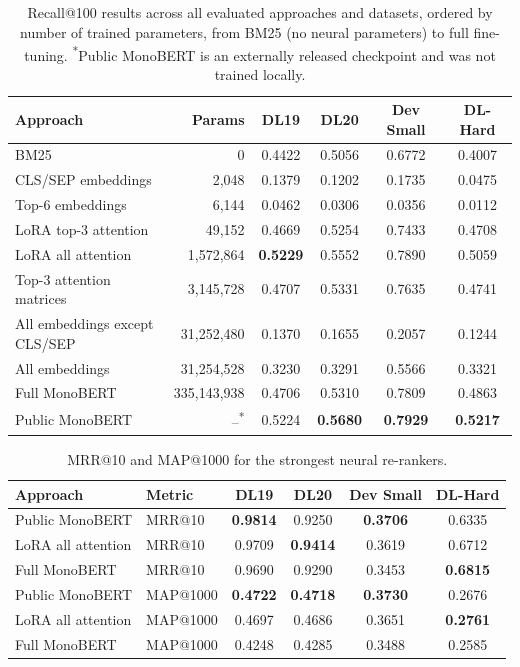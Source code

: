 \begin{table}[ht]
\centering
\small
\begin{tabular}{lrcccc}
\hline
\textbf{Approach} & \textbf{Params} & \textbf{DL19} & \textbf{DL20} & \textbf{Dev Small} & \textbf{DL-Hard} \\
\hline
BM25 & 0 & 0.4422 & 0.5056 & 0.6772 & 0.4007 \\
CLS/SEP embeddings & 2,048 & 0.1379 & 0.1202 & 0.1735 & 0.0475 \\
Top-6 embeddings & 6,144 & 0.0462 & 0.0306 & 0.0356 & 0.0112 \\
LoRA top-3 attention & 49,152 & 0.4669 & 0.5254 & 0.7433 & 0.4708 \\
LoRA all attention & 1,572,864 & \textbf{0.5229} & 0.5552 & 0.7890 & 0.5059 \\
Top-3 attention matrices & 3,145,728 & 0.4707 & 0.5331 & 0.7635 & 0.4741 \\
All embeddings except CLS/SEP & 31,252,480 & 0.1370 & 0.1655 & 0.2057 & 0.1244 \\
All embeddings & 31,254,528 & 0.3230 & 0.3291 & 0.5566 & 0.3321 \\
Full MonoBERT & 335,143,938 & 0.4706 & 0.5310 & 0.7809 & 0.4863 \\
Public MonoBERT & --\textsuperscript{*} & 0.5224 & \textbf{0.5680} & \textbf{0.7929} & \textbf{0.5217} \\
\hline
\end{tabular}
\caption{Recall@100 results across all evaluated approaches and datasets, ordered by number of trained parameters, from BM25 (no neural parameters) to full fine-tuning. \textsuperscript{*}Public MonoBERT is an externally released checkpoint and was not trained locally.}
\label{tab:results_recall}
\end{table}

\begin{table}[ht]
\centering
\small
\begin{tabular}{llcccc}
\hline
\textbf{Approach} & \textbf{Metric} & \textbf{DL19} & \textbf{DL20} & \textbf{Dev Small} & \textbf{DL-Hard} \\
\hline
Public MonoBERT & MRR@10 & \textbf{0.9814} & 0.9250 & \textbf{0.3706} & 0.6335 \\
LoRA all attention & MRR@10 & 0.9709 & \textbf{0.9414} & 0.3619 & 0.6712 \\
Full MonoBERT & MRR@10 & 0.9690 & 0.9290 & 0.3453 & \textbf{0.6815} \\
\hline
Public MonoBERT & MAP@1000 & \textbf{0.4722} & \textbf{0.4718} & \textbf{0.3730} & 0.2676 \\
LoRA all attention & MAP@1000 & 0.4697 & 0.4686 & 0.3651 & \textbf{0.2761} \\
Full MonoBERT & MAP@1000 & 0.4248 & 0.4285 & 0.3488 & 0.2585 \\
\hline
\end{tabular}
\caption{MRR@10 and MAP@1000 for the strongest neural re-rankers.}
\label{tab:results_mrr_map_best}
\end{table}

